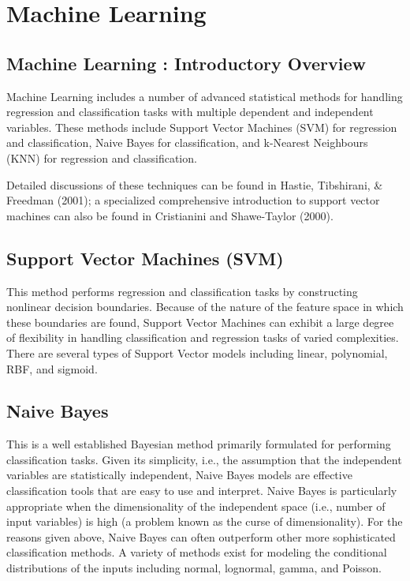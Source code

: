 
\section{Machine Learning}



\subsection{Machine Learning : Introductory Overview}

Machine Learning includes a number of advanced statistical methods for handling regression and classification tasks with multiple dependent and independent variables. These methods include Support Vector Machines (SVM) for regression and classification, Naive Bayes for classification, and k-Nearest Neighbours (KNN) for regression and classification.

Detailed discussions of these techniques can be found in Hastie, Tibshirani, \& Freedman (2001); a specialized comprehensive introduction to support vector machines can also be found in Cristianini and Shawe-Taylor (2000).


\subsection{Support Vector Machines (SVM)}

This method performs regression and classification tasks by constructing nonlinear decision boundaries. Because of the nature of the feature space in which these boundaries are found, Support Vector Machines can exhibit a large degree of flexibility in handling classification and regression tasks of varied complexities. There are several types of Support Vector models including linear, polynomial, RBF, and sigmoid.



\subsection{Naive Bayes}

This is a well established Bayesian method primarily formulated for performing classification tasks. Given its simplicity, i.e., the assumption that the independent variables are statistically independent, Naive Bayes models are effective classification tools that are easy to use and interpret. Naive Bayes is particularly appropriate when the dimensionality of the independent space (i.e., number of input variables) is high (a problem known as the curse of dimensionality). For the reasons given above, Naive Bayes can often outperform other more sophisticated classification methods. A variety of methods exist for modeling the conditional distributions of the inputs including normal, lognormal, gamma, and Poisson.




